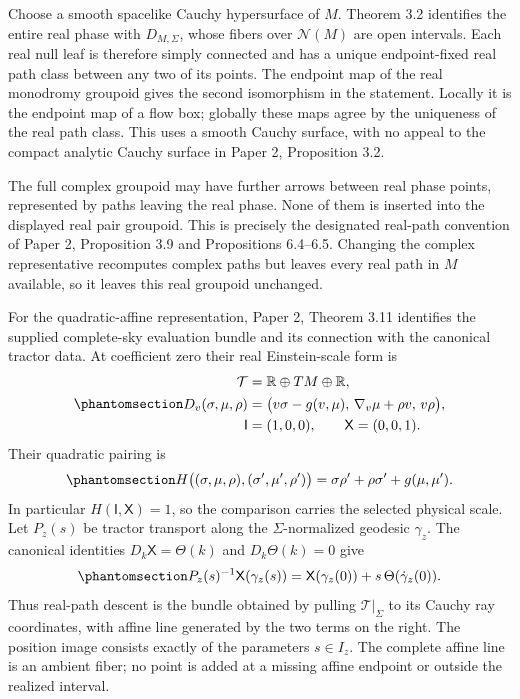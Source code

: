 \documentclass[
  english,
  11pt,
  reqno]{amsart}
\begin{document}
Choose a smooth spacelike Cauchy hypersurface of \(M\). Theorem 3.2
identifies the entire real phase with \(D_{M,\Sigma}\), whose fibers
over \(\mathcal N(M)\) are open intervals. Each real null leaf is
therefore simply connected and has a unique endpoint-fixed real path
class between any two of its points. The endpoint map of the real
monodromy groupoid gives the second isomorphism in the statement.
Locally it is the endpoint map of a flow box; globally these maps agree
by the uniqueness of the real path class. This uses a smooth Cauchy
surface, with no appeal to the compact analytic Cauchy surface in Paper
2, Proposition 3.2.

The full complex groupoid may have further arrows between real phase
points, represented by paths leaving the real phase. None of them is
inserted into the displayed real pair groupoid. This is precisely the
designated real-path convention of Paper 2, Proposition 3.9 and
Propositions 6.4--6.5. Changing the complex representative recomputes
complex paths but leaves every real path in \(M\) available, so it
leaves this real groupoid unchanged.

For the quadratic-affine representation, Paper 2, Theorem 3.11
identifies the supplied complete-sky evaluation bundle and its
connection with the canonical tractor data. At coefficient zero their
real Einstein-scale form is
\begin{equation}\protect\phantomsection\label{eq:analytic-real-zero-scalar-tractor}{
\begin{aligned}
\mathcal T&=\mathbb R\oplus TM\oplus\mathbb R,\\
D_v(\sigma,\mu,\rho)
&=\bigl(v\sigma-g(v,\mu),\,
        \nabla_v\mu+\rho v,\,v\rho\bigr),\\
\mathsf I&=(1,0,0),\qquad \mathsf X=(0,0,1).
\end{aligned}
}\end{equation} Their quadratic pairing is
\begin{equation}\protect\phantomsection\label{eq:analytic-real-zero-scalar-pairing}{
H\bigl((\sigma,\mu,\rho),(\sigma',\mu',\rho')\bigr)
=\sigma\rho'+\rho\sigma'+g(\mu,\mu').
}\end{equation} In particular \(H(\mathsf I,\mathsf X)=1\), so the
comparison carries the selected physical scale. Let \(P_z(s)\) be
tractor transport along the \(\Sigma\)-normalized geodesic \(\gamma_z\).
The canonical identities \(D_k\mathsf X=\Theta(k)\) and
\(D_k\Theta(k)=0\) give
\begin{equation}\protect\phantomsection\label{eq:analytic-real-affine-interval-comparison}{
P_z(s)^{-1}\mathsf X(\gamma_z(s))
=\mathsf X(\gamma_z(0))+s\,\Theta(\dot\gamma_z(0)).
}\end{equation} Thus real-path descent is the bundle obtained by pulling
\(\mathcal T|_\Sigma\) to its Cauchy ray coordinates, with affine line
generated by the two terms on the right. The position image consists
exactly of the parameters \(s\in I_z\). The complete affine line is an
ambient fiber; no point is added at a missing affine endpoint or outside
the realized interval.
\end{document}
